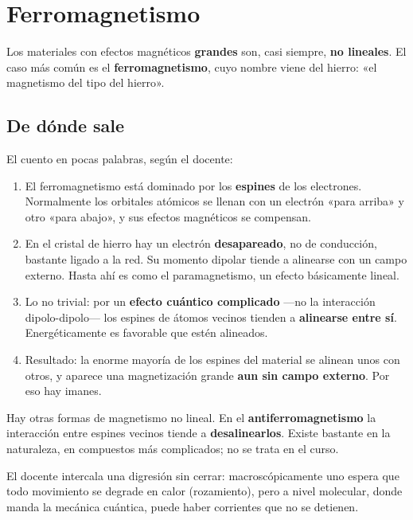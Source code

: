 \documentclass[12pt,a4paper]{article}
\begin{document}
\section{Ferromagnetismo}

Los materiales con efectos magnéticos \textbf{grandes} son, casi siempre, \textbf{no
lineales}. El caso más común es el \textbf{ferromagnetismo}, cuyo nombre viene del
hierro: «el magnetismo del tipo del hierro».

\subsection{De dónde sale}

El cuento en pocas palabras, según el docente:

\begin{enumerate}
  \item El ferromagnetismo está dominado por los \textbf{espines} de los electrones.
  Normalmente los orbitales atómicos se llenan con un electrón «para arriba» y
  otro «para abajo», y sus efectos magnéticos se compensan.
  \item En el cristal de hierro hay un electrón \textbf{desapareado}, no de conducción,
  bastante ligado a la red. Su momento dipolar tiende a alinearse con un campo
  externo. Hasta ahí es como el paramagnetismo, un efecto básicamente lineal.
  \item Lo no trivial: por un \textbf{efecto cuántico complicado} ---no la interacción
  dipolo-dipolo--- los espines de átomos vecinos tienden a \textbf{alinearse entre
  sí}. Energéticamente es favorable que estén alineados.
  \item Resultado: la enorme mayoría de los espines del material se alinean unos con
  otros, y aparece una magnetización grande \textbf{aun sin campo externo}. Por eso
  hay imanes.
\end{enumerate}

\begin{notebox}
Hay otras formas de magnetismo no lineal. En el \textbf{antiferromagnetismo} la
interacción entre espines vecinos tiende a \textbf{desalinearlos}. Existe
bastante en la naturaleza, en compuestos más complicados; no se trata en el
curso.
\end{notebox}

\begin{notebox}
El docente intercala una digresión sin cerrar: macroscópicamente uno espera
que todo movimiento se degrade en calor (rozamiento), pero a nivel molecular,
donde manda la mecánica cuántica, puede haber corrientes que no se detienen.
\end{notebox}
\end{document}
